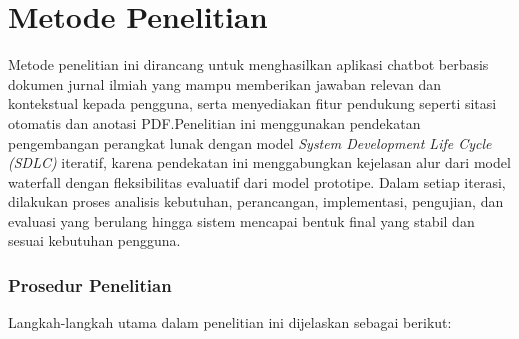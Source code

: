 \section{Metode Penelitian}

Metode penelitian ini dirancang untuk menghasilkan aplikasi chatbot berbasis dokumen jurnal ilmiah yang mampu memberikan jawaban relevan dan kontekstual kepada pengguna, serta menyediakan fitur pendukung seperti sitasi otomatis dan anotasi PDF.\@ Penelitian ini menggunakan pendekatan pengembangan perangkat lunak dengan model \textit{System Development Life Cycle (SDLC)} iteratif, karena pendekatan ini menggabungkan kejelasan alur dari model waterfall dengan fleksibilitas evaluatif dari model prototipe. Dalam setiap iterasi, dilakukan proses analisis kebutuhan, perancangan, implementasi, pengujian, dan evaluasi yang berulang hingga sistem mencapai bentuk final yang stabil dan sesuai kebutuhan pengguna.

\subsubsection*{Prosedur Penelitian}

Langkah-langkah utama dalam penelitian ini dijelaskan sebagai berikut:

